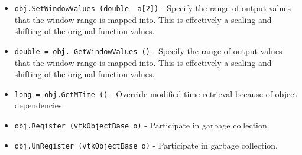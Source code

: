 \begin{itemize}
\item  \verb|obj.SetWindowValues (double  a[2])| -  Specify the range of output values that the window range is mapped
 into. This is effectively a scaling and shifting of the original
 function values.

\item  \verb|double = obj. GetWindowValues ()| -  Specify the range of output values that the window range is mapped
 into. This is effectively a scaling and shifting of the original
 function values.

\item  \verb|long = obj.GetMTime ()| -  Override modified time retrieval because of object dependencies.

\item  \verb|obj.Register (vtkObjectBase o)| -  Participate in garbage collection.

\item  \verb|obj.UnRegister (vtkObjectBase o)| -  Participate in garbage collection.

\end{itemize}
